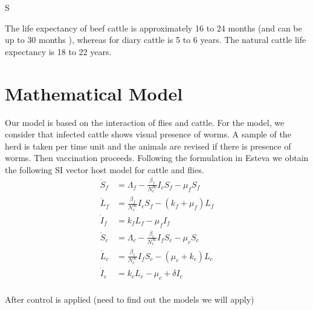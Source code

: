 S\documentclass[preprint,12pt]{elsarticle}
\begin{document}
\noindent The life expectancy of beef cattle is approximately 16 to 24 months (and can be up to 30 months \cite{stanley:2003}), whereas for diary cattle is 5 to 6 years. The natural cattle life expectancy is 18 to 22 years.


\section{Mathematical Model}

\noindent Our model is based on the interaction of flies and cattle. For the model, we consider that infected cattle shows visual presence of worms. A sample of the herd is taken per time unit and the animals are revised if there is presence of worms. Then vaccination proceeds.  
Following the formulation in Esteva \cite{Esteva:1998} we obtain the 
following SI vector host model for cattle and flies.
\begin{equation}\label{Eq:SIvectorhostmodel}
\begin{aligned}
    \dot{S}_f&= 
        \Lambda_f-\frac{\beta_f}{N_c^{\infty}}I_cS_f-\mu_fS_f
    \\
    \dot{L}_f&= 
        \frac{\beta_f}{N_c^{\infty}}I_cS_f-\left(k_f+\mu_f\right)L_f
    \\
    \dot{I}_f&= 
        k_f L_f-\mu_fI_f
    \\
    \dot{S}_c&= 
        \Lambda_c-\frac{\beta_c}{N_c^{\infty}}I_fS_c-\mu_cS_c
    \\
    \dot{L}_c&= 
        \frac{\beta_c}{N_c^{\infty}}I_fS_c-\left(\mu_c+k_c\right)L_c
    \\
    \dot{I}_c&= k_c L_c-\mu_c +\delta I_c
    \\
\end{aligned}
\end{equation}

\noindent After control is applied (need to find out the models we will apply)
\end{document}
